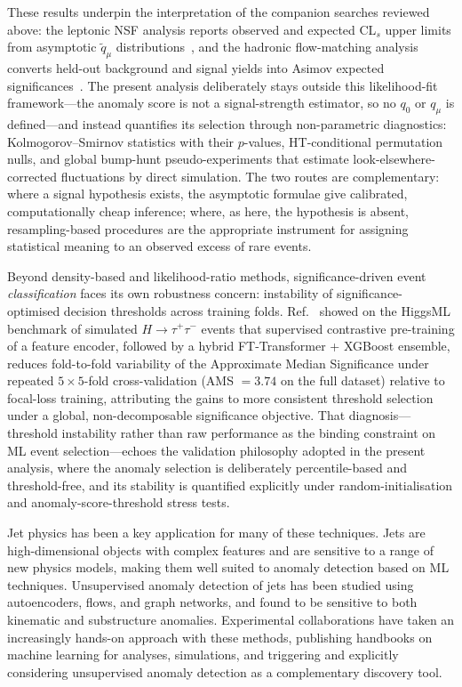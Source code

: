 \documentclass[11pt,a4paper,twocolumn]{article}
\begin{document}
These results underpin the interpretation of the companion searches reviewed above: the leptonic NSF analysis reports observed and expected CL$_s$ upper limits from asymptotic $\tilde{q}_\mu$ distributions~\cite{Rasineni2026MonoZNSF}, and the hadronic flow-matching analysis converts held-out background and signal yields into Asimov expected significances~\cite{Rasineni2026HadronicFlowMatching}. The present analysis deliberately stays outside this likelihood-fit framework---the anomaly score is not a signal-strength estimator, so no $q_0$ or $q_\mu$ is defined---and instead quantifies its selection through non-parametric diagnostics: Kolmogorov--Smirnov statistics with their $p$-values, HT-conditional permutation nulls, and global bump-hunt pseudo-experiments that estimate look-elsewhere-corrected fluctuations by direct simulation. The two routes are complementary: where a signal hypothesis exists, the asymptotic formulae give calibrated, computationally cheap inference; where, as here, the hypothesis is absent, resampling-based procedures are the appropriate instrument for assigning statistical meaning to an observed excess of rare events.

Beyond density-based and likelihood-ratio methods, significance-driven event \emph{classification} faces its own robustness concern: instability of significance-optimised decision thresholds across training folds. Ref.~\cite{Pujari2026Contrastive} showed on the HiggsML benchmark of simulated $H\to\tau^+\tau^-$ events that supervised contrastive pre-training of a feature encoder, followed by a hybrid FT-Transformer + XGBoost ensemble, reduces fold-to-fold variability of the Approximate Median Significance under repeated $5\times5$-fold cross-validation (AMS $= 3.74$ on the full dataset) relative to focal-loss training, attributing the gains to more consistent threshold selection under a global, non-decomposable significance objective. That diagnosis---threshold instability rather than raw performance as the binding constraint on ML event selection---echoes the validation philosophy adopted in the present analysis, where the anomaly selection is deliberately percentile-based and threshold-free, and its stability is quantified explicitly under random-initialisation and anomaly-score-threshold stress tests.

Jet physics has been a key application for many of these techniques. Jets are high-dimensional objects with complex features and are sensitive to a range of new physics models, making them well suited to anomaly detection based on ML techniques. Unsupervised anomaly detection of jets has been studied using autoencoders, flows, and graph networks, and found to be sensitive to both kinematic and substructure anomalies. Experimental collaborations have taken an increasingly hands-on approach with these methods, publishing handbooks on machine learning for analyses, simulations, and triggering and explicitly considering unsupervised anomaly detection as a complementary discovery tool.
\end{document}

